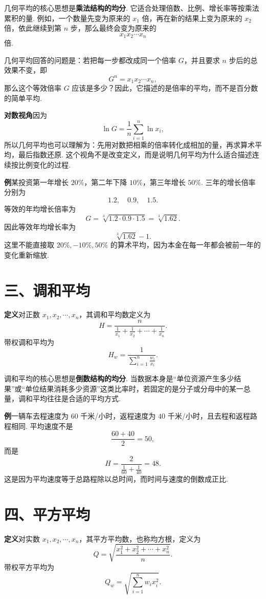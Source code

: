 \documentclass[UTF8, 12pt, fontset=fandol, oneside]{ctexart}
\begin{document}
几何平均的核心思想是\textbf{乘法结构的均分}. 它适合处理倍数、比例、增长率等按乘法累积的量. 例如，一个数量先变为原来的 $x_1$ 倍，再在新的结果上变为原来的 $x_2$ 倍，依此继续到第 $n$ 步，那么最终会变为原来的
\[
  x_1x_2\cdots x_n
\]
倍.

几何平均回答的问题是：若把每一步都改成同一个倍率 $G$，并且要求 $n$ 步后的总效果不变，即
\[
  G^n=x_1x_2\cdots x_n,
\]
那么这个等效倍率 $G$ 应该是多少？因此，它描述的是倍率的平均，而不是百分数的简单平均.

\noindent\textbf{对数视角}\quad 因为
\[
  \ln G=\frac{1}{n}\sum_{i=1}^n \ln x_i,
\]
所以几何平均也可以理解为：先用对数把相乘的倍率转化成相加的量，再求算术平均，最后指数还原. 这个视角不是改变定义，而是说明几何平均为什么适合描述连续按比例变化的过程.

\noindent\textbf{例}\quad 某投资第一年增长 $20\%$，第二年下降 $10\%$，第三年增长 $50\%$. 三年的增长倍率分别为
\[
  1.2,\quad 0.9,\quad 1.5.
\]
等效的年均增长倍率为
\[
  G=\sqrt[3]{1.2\cdot0.9\cdot1.5}=\sqrt[3]{1.62}.
\]
因此等效年均增长率为
\[
  \sqrt[3]{1.62}-1.
\]
这里不能直接取 $20\%,-10\%,50\%$ 的算术平均，因为本金在每一年都会被前一年的变化重新缩放.

\section*{三、调和平均}

\noindent\textbf{定义}\quad 对正数 $x_1,x_2,\cdots,x_n$，其调和平均数定义为
\[
  H=\frac{n}{\frac{1}{x_1}+\frac{1}{x_2}+\cdots+\frac{1}{x_n}}.
\]
带权调和平均为
\[
  H_w=\frac{1}{\sum_{i=1}^n \frac{w_i}{x_i}}.
\]

调和平均的核心思想是\textbf{倒数结构的均分}. 当数据本身是``单位资源产生多少结果''或``单位结果消耗多少资源''这类比率时，若固定的是分子或分母中的某一总量，调和平均往往是合适的平均方式.

\noindent\textbf{例}\quad 一辆车去程速度为 $60$ 千米/小时，返程速度为 $40$ 千米/小时，且去程和返程路程相同. 平均速度不是
\[
  \frac{60+40}{2}=50,
\]
而是
\[
  H=\frac{2}{\frac{1}{60}+\frac{1}{40}}=48.
\]
这是因为平均速度等于总路程除以总时间，而时间与速度的倒数成正比.

\section*{四、平方平均}

\noindent\textbf{定义}\quad 对实数 $x_1,x_2,\cdots,x_n$，其平方平均数，也称均方根，定义为
\[
  Q=\sqrt{\frac{x_1^2+x_2^2+\cdots+x_n^2}{n}}.
\]
带权平方平均为
\[
  Q_w=\sqrt{\sum_{i=1}^n w_i x_i^2}.
\]
\end{document}
